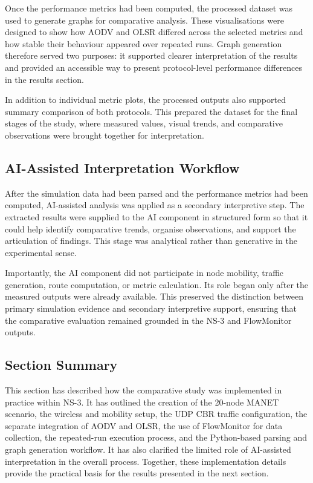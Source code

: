 \documentclass{Academic}
\begin{document}
Once the performance metrics had been computed, the processed dataset was used to generate graphs for comparative analysis. These visualisations were designed to show how AODV and OLSR differed across the selected metrics and how stable their behaviour appeared over repeated runs. Graph generation therefore served two purposes: it supported clearer interpretation of the results and provided an accessible way to present protocol-level performance differences in the results section.

In addition to individual metric plots, the processed outputs also supported summary comparison of both protocols. This prepared the dataset for the final stages of the study, where measured values, visual trends, and comparative observations were brought together for interpretation.

\subsection{AI-Assisted Interpretation Workflow}

After the simulation data had been parsed and the performance metrics had been computed, AI-assisted analysis was applied as a secondary interpretive step. The extracted results were supplied to the AI component in structured form so that it could help identify comparative trends, organise observations, and support the articulation of findings. This stage was analytical rather than generative in the experimental sense.

Importantly, the AI component did not participate in node mobility, traffic generation, route computation, or metric calculation. Its role began only after the measured outputs were already available. This preserved the distinction between primary simulation evidence and secondary interpretive support, ensuring that the comparative evaluation remained grounded in the NS-3 and FlowMonitor outputs.

\subsection{Section Summary}

This section has described how the comparative study was implemented in practice within NS-3. It has outlined the creation of the 20-node MANET scenario, the wireless and mobility setup, the UDP CBR traffic configuration, the separate integration of AODV and OLSR, the use of FlowMonitor for data collection, the repeated-run execution process, and the Python-based parsing and graph generation workflow. It has also clarified the limited role of AI-assisted interpretation in the overall process. Together, these implementation details provide the practical basis for the results presented in the next section.
\end{document}
